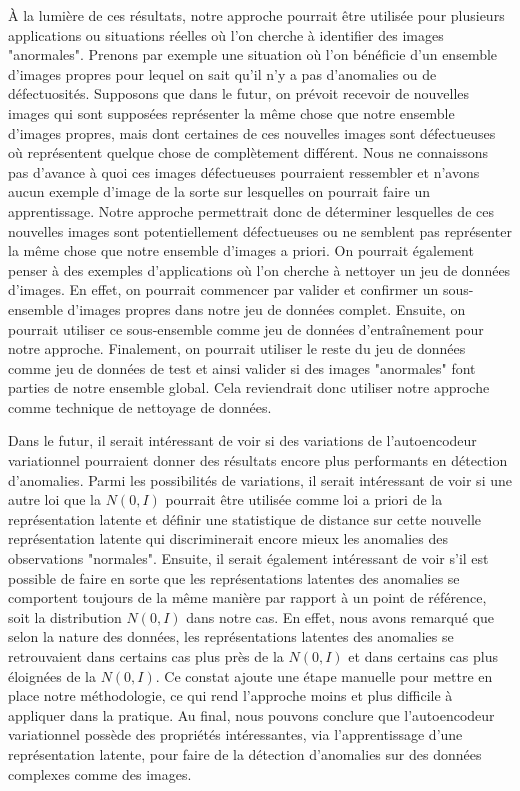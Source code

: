 À la lumière de ces résultats, notre approche pourrait être utilisée pour plusieurs applications ou situations réelles où l'on cherche à identifier des images "anormales". Prenons par exemple une situation où l'on bénéficie d'un ensemble d'images propres pour lequel on sait qu'il n'y a pas d'anomalies ou de défectuosités. Supposons que dans le futur, on prévoit recevoir de nouvelles images qui sont supposées représenter la même chose que notre ensemble d'images propres, mais dont certaines de ces nouvelles images sont défectueuses où représentent quelque chose de complètement différent. Nous ne connaissons pas d'avance à quoi ces images défectueuses pourraient ressembler et n'avons aucun exemple d'image de la sorte sur lesquelles on pourrait faire un apprentissage. Notre approche permettrait donc de déterminer lesquelles de ces nouvelles images sont potentiellement défectueuses ou ne semblent pas représenter la même chose que notre ensemble d'images a priori. On pourrait également penser à des exemples d'applications où l'on cherche à nettoyer un jeu de données d'images. En effet, on pourrait commencer par valider et confirmer un sous-ensemble d'images propres dans notre jeu de données complet. Ensuite, on pourrait utiliser ce sous-ensemble comme jeu de données d'entraînement pour notre approche. Finalement, on pourrait utiliser le reste du jeu de données comme jeu de données de test et ainsi valider si des images "anormales" font parties de notre ensemble global. Cela reviendrait donc \DIFaddbegin {}\DIFaddend utiliser notre approche comme technique de nettoyage de données.

Dans le futur, il serait intéressant de voir si des variations de l'autoencodeur variationnel pourraient donner des résultats encore plus performants en détection d'anomalies. Parmi les possibilités de variations, il serait intéressant de voir si une autre loi que la $N(0,I)$ pourrait être utilisée comme loi a priori de la représentation latente et définir une statistique de distance sur cette nouvelle représentation latente qui discriminerait encore mieux les anomalies des observations "normales". Ensuite, il serait également intéressant de voir s'il est possible de faire en sorte que les représentations latentes des anomalies se comportent toujours de la même manière par rapport à un point de référence, soit la distribution $N(0,I)$ dans notre cas. En effet, nous avons remarqué que selon la nature des données, les représentations latentes des anomalies se retrouvaient dans certains cas plus près de la $N(0,I)$ et dans certains cas  plus éloignées de la $N(0,I)$. Ce constat ajoute une étape manuelle pour mettre en place notre méthodologie, ce qui rend l'approche moins \DIFdelbegin {}\DIFdelend \DIFaddbegin {}\DIFaddend et plus difficile à appliquer dans la pratique. Au final, nous pouvons conclure que l'autoencodeur variationnel possède des propriétés intéressantes, via l'apprentissage d'une représentation latente, pour faire de la détection d'anomalies sur des données complexes comme des images.


